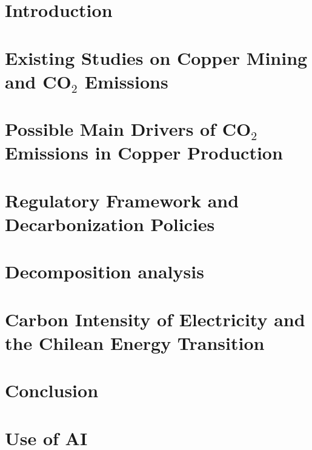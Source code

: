 \documentclass[11pt]{article}
\begin{document}


\tableofcontents
\newpage

\section{Introduction}
	
    \newpage

\section{Existing Studies on Copper Mining and CO$_2$ Emissions}
	
    \newpage

\section{Possible Main Drivers of CO$_2$ Emissions in Copper Production}
    
    \newpage
    
\section{Regulatory Framework and Decarbonization Policies}
    
    \newpage
    
\section{Decomposition analysis}
\label{sec:decomposition}
    
    \newpage
\section{Carbon Intensity of Electricity and the Chilean Energy Transition}
    
    \newpage
\section{Conclusion}

\section{Use of AI}

\newpage


\end{document}
